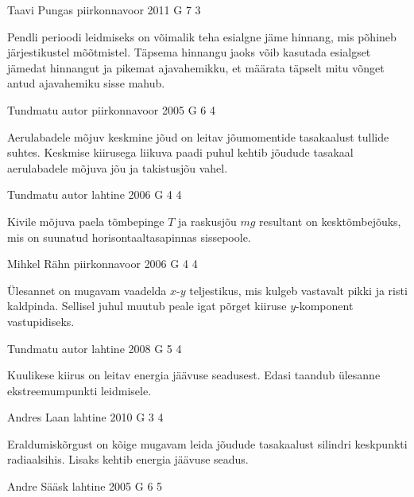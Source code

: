 \documentclass[11pt, twoside]{article}
\begin{document}
{%
{Taavi Pungas} %
{piirkonnavoor} %
{2011} %
{G 7} %
{3} %
{

\ifHint
Pendli perioodi leidmiseks on võimalik teha esialgne jäme hinnang, mis põhineb järjestikustel mõõtmistel. Täpsema hinnangu jaoks võib kasutada esialgset jämedat hinnangut ja pikemat ajavahemikku, et määrata täpselt mitu võnget antud ajavahemiku sisse mahub.
\fi
}

{Tundmatu autor} %
{piirkonnavoor} %
{2005} %
{G 6} %
{4} %
{

\ifHint
Aerulabadele mõjuv keskmine jõud on leitav jõumomentide tasakaalust tullide suhtes. Keskmise kiirusega liikuva paadi puhul kehtib jõudude tasakaal aerulabadele mõjuva jõu ja takistusjõu vahel.
\fi
}

{Tundmatu autor} %
{lahtine} %
{2006} %
{G 4} %
{4} %
{

\ifHint
Kivile mõjuva paela tõmbepinge $T$ ja raskusjõu $mg$ resultant on kesktõmbejõuks, mis on suunatud horisontaaltasapinnas sissepoole.
\fi
}

{Mihkel Rähn} %
{piirkonnavoor} %
{2006} %
{G 4} %
{4} %
{

\ifHint
Ülesannet on mugavam vaadelda $x$-$y$ teljestikus, mis kulgeb vastavalt pikki ja risti kaldpinda. Sellisel juhul muutub peale igat põrget kiiruse $y$-komponent vastupidiseks.
\fi
}

{Tundmatu autor} %
{lahtine} %
{2008} %
{G 5} %
{4} %
{

\ifHint
Kuulikese kiirus on leitav energia jäävuse seadusest. Edasi taandub ülesanne ekstreemumpunkti leidmisele.
\fi
}

{Andres Laan} %
{lahtine} %
{2010} %
{G 3} %
{4} %
{

\ifHint
Eraldumiskõrgust on kõige mugavam leida jõudude tasakaalust silindri keskpunkti radiaalsihis. Lisaks kehtib energia jäävuse seadus.
\fi
}

{Andre Sääsk} %
{lahtine} %
{2005} %
{G 6} %
{5} %
{

}}
\end{document}
